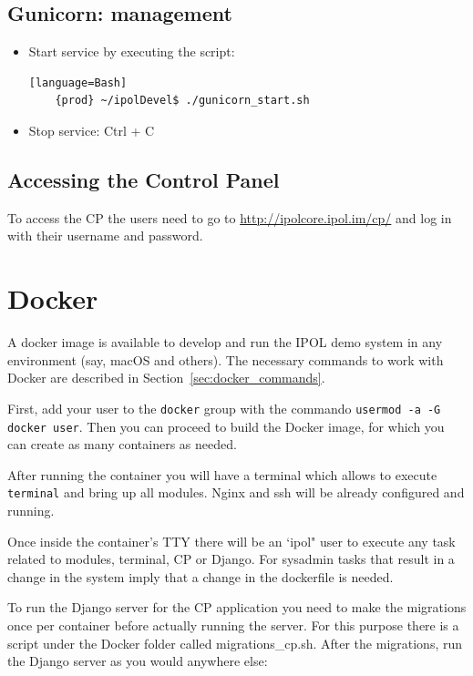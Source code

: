 \documentclass[a4paper,12pt]{article}
\begin{document}
\subsection{Gunicorn: management}
\begin{itemize}
    \item Start service by executing the script:
    \begin{verbatim}[language=Bash]
    {prod} ~/ipolDevel$ ./gunicorn_start.sh
    \end{verbatim}

    \item Stop service: Ctrl + C
\end{itemize}



\subsection{Accessing the Control Panel}
To access the CP the users need to go to \url{http://ipolcore.ipol.im/cp/} and log in with their username and password.




\section{Docker}
A docker image is available to develop and run the IPOL demo system in any environment (say, macOS and others).
The necessary commands to work with Docker are described in Section~\ref{sec:docker_commands}.

First, add your user to the {\tt docker} group with the commando {\tt usermod -a -G docker user}.
Then you can proceed to build the Docker image, for which you can create as many containers as needed.

After running the container you will have a terminal which allows to execute {\tt terminal} and bring up all modules. Nginx and ssh will be already
configured and running.

Once inside the container's TTY there will be an `ipol" user to execute any task related to modules, terminal, 
CP or Django. For sysadmin tasks that result in a change in the system imply that a change in the dockerfile is needed.
 
To run the Django server for the CP application you need to make the migrations once per
container before actually running the server. For this purpose there is a script under the Docker folder called migrations\_cp.sh.
After the migrations, run the Django server as you would anywhere else:
\end{document}
